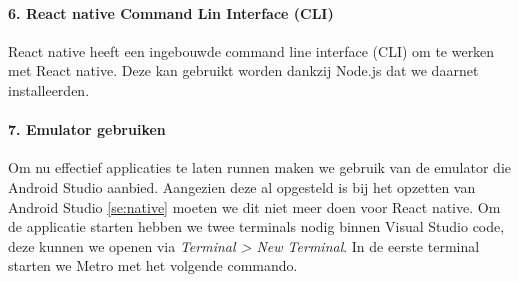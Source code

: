 \paragraph{6. React native Command Lin Interface (CLI)}
React native heeft een ingebouwde command line interface (CLI) om te werken met React native. 
Deze kan gebruikt worden dankzij Node.js dat we daarnet installeerden.

\paragraph{7. Emulator gebruiken}
Om nu effectief applicaties te laten runnen maken we gebruik van de emulator die Android Studio aanbied. 
Aangezien deze al opgesteld is bij het opzetten van Android Studio \ref{se:native} 
moeten we dit niet meer doen voor React native. Om de applicatie starten hebben we twee terminals nodig 
binnen Visual Studio code, deze kunnen we openen via \textit{Terminal > New Terminal}. 
In de eerste terminal starten we \gls{Metro} met het volgende commando.

